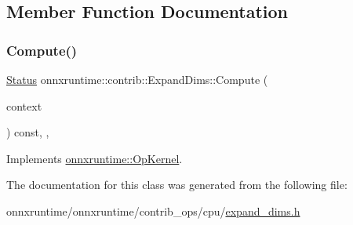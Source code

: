 \subsection{Member Function Documentation}
\mbox{\label{classonnxruntime_1_1contrib_1_1ExpandDims_ae8e99883cb96521663ca609cf2d928a3}} 
\subsubsection{\texorpdfstring{Compute()}{Compute()}}
{\footnotesize\ttfamily \mbox{\hyperlink{classonnxruntime_1_1common_1_1Status}{Status}} onnxruntime\+::contrib\+::\+Expand\+Dims\+::\+Compute (\begin{DoxyParamCaption}\item[{\mbox{\hyperlink{classonnxruntime_1_1OpKernelContext}{Op\+Kernel\+Context}} $\ast$}]{context }\end{DoxyParamCaption}) const\hspace{0.3cm}{\ttfamily [inline]}, {\ttfamily [override]}, {\ttfamily [virtual]}}



Implements \mbox{\hyperlink{classonnxruntime_1_1OpKernel_a9eca8656a78b1b3ab9d3351a12798650}{onnxruntime\+::\+Op\+Kernel}}.



The documentation for this class was generated from the following file\+:\begin{DoxyCompactItemize}
\item 
onnxruntime/onnxruntime/contrib\+\_\+ops/cpu/\mbox{\hyperlink{expand__dims_8h}{expand\+\_\+dims.\+h}}\end{DoxyCompactItemize}
